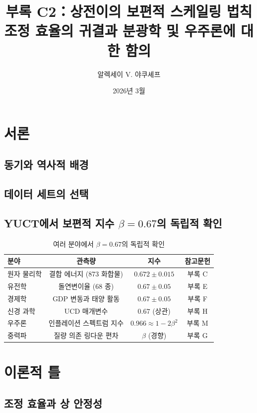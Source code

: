\documentclass[11pt,a4paper]{article}
\title{부록 C2：상전이의 보편적 스케일링 법칙\\
	\large 조정 효율의 귀결과 분광학 및 우주론에 대한 함의}
\author{알렉세이 V. 야쿠셰프}
\date{2026년 3월}
\begin{document}
	
	\maketitle
	\tableofcontents
	
	\section{서론}
	\subsection{동기와 역사적 배경}
	\subsection{데이터 세트의 선택}
	\subsection{YUCT에서 보편적 지수 \(\beta = 0.67\)의 독립적 확인}
	
	\begin{table}[htbp]
		\centering
		\caption{여러 분야에서 \(\beta = 0.67\)의 독립적 확인}
		\label{tab:beta_confirmation}
		\begin{tabular}{@{}lccc@{}}
			\toprule
			\textbf{분야} & \textbf{관측량} & \textbf{지수} & \textbf{참고문헌} \\
			\midrule
			원자 물리학 & 결합 에너지 (873 화합물) & \(0.672\pm0.015\) & 부록 C \\
			유전학 & 돌연변이율 (68 종) & \(0.67\pm0.05\) & 부록 E \\
			경제학 & GDP 변동과 태양 활동 & \(0.67\pm0.05\) & 부록 F \\
			신경 과학 & UCD 매개변수 & \(0.67\) (상관) & 부록 H \\
			우주론 & 인플레이션 스펙트럼 지수 & \(0.966 \approx 1-2\beta^2\) & 부록 M \\
			중력파 & 질량 의존 링다운 편차 & \(\beta\) (경향) & 부록 G \\
			\bottomrule
		\end{tabular}
	\end{table}
	
	\section{이론적 틀}
	\subsection{조정 효율과 상 안정성}
\end{document}
